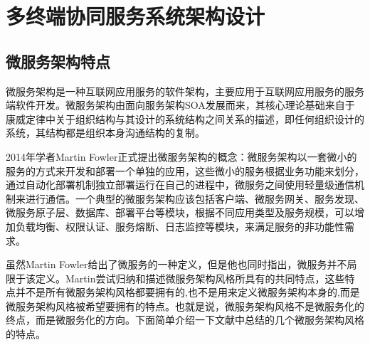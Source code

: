 \section{多终端协同服务系统架构设计}\label{sec:service_system_design}

\subsection{微服务架构特点}

微服务架构是一种互联网应用服务的软件架构，主要应用于互联网应用服务的服务端软件开发。微服务架构由面向服务架构SOA发展而来，其核心理论基础来自于康威定律\cite{conway1968committees}中关于组织结构与其设计的系统结构之间关系的描述，即任何组织设计的系统，其结构都是组织本身沟通结构的复制。

2014年学者Martin Fowler正式提出微服务架构的概念\cite{lewis2014microservices}：微服务架构以一套微小的服务的方式来开发和部署一个单独的应用，这些微小的服务根据业务功能来划分，通过自动化部署机制独立部署运行在自己的进程中，微服务之间使用轻量级通信机制来进行通信。一个典型的微服务架构应该包括客户端、微服务网关、服务发现、微服务原子层、数据库、部署平台等模块，根据不同应用类型及服务规模，可以增加负载均衡、权限认证、服务熔断、日志监控等模块，来满足服务的非功能性需求。

虽然Martin Fowler给出了微服务的一种定义，但是他也同时指出，微服务并不局限于该定义。Martin尝试归纳和描述微服务架构风格所具有的共同特点，这些特点并不是所有微服务架构风格都要拥有的,也不是用来定义微服务架构本身的,而是微服务架构风格被希望要拥有的特点。也就是说，微服务架构风格不是微服务化的终点，而是微服务化的方向。下面简单介绍一下文献\cite{lewis2014microservices}中总结的几个微服务架构风格的特点。

